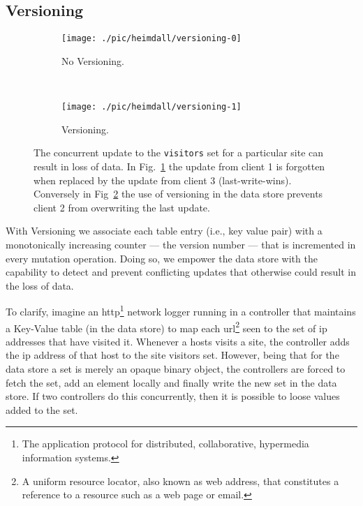 \subsection {Versioning}
\label{sec:heimdall:versioning}
\begin{figure}[ht]
  \centering
  \begin{subfigure}[b]{0.5\textwidth}
                \centering
                \texttt{[image: ./pic/heimdall/versioning-0]}
                \caption{No Versioning.} 
                \label{fig:heimdall:versioning-0}

        \end{subfigure}%
        ~
        \begin{subfigure}[b]{0.5\textwidth}
                \centering
                \texttt{[image: ./pic/heimdall/versioning-1]}
                \caption{Versioning.}
                \label{fig:heimdall:versioning-1}
        \end{subfigure}
  \caption[Concurrent updates]{The concurrent update to the \texttt{visitors} set for a particular site can result in loss of data. In  Fig.~\ref{fig:heimdall:versioning-0} the update from client 1 is forgotten  when replaced by the update from client 3 (last-write-wins).  Conversely in Fig~\ref{fig:heimdall:versioning-1} the use of versioning in the data store prevents client 2 from overwriting the last update.}
\label{fig:heimdall:versioning}
\end{figure}

With Versioning we associate each table entry (i.e., key value pair)  with a monotonically increasing counter --- the version number ---   that is incremented in every mutation operation. 
Doing so, we empower the data store with the capability to detect and prevent conflicting updates that otherwise could result in the loss of data. 

To clarify, imagine an \gls{http}\footnote{The application protocol for distributed, collaborative, hypermedia information systems.} network logger running in a controller that maintains  a Key-Value table  (in the data store) to map each \gls{url}\footnote{A uniform resource locator, also known as web address,  that constitutes a reference to a resource such as a web page or email.} seen to the set of \gls{ip} addresses that have visited it. 
Whenever a hosts visits a site, the controller adds the \gls{ip} address of that host to the site visitors set. 
However, being that  for the data store a set is merely an opaque binary object, the controllers are forced to fetch the set, add an element locally and finally write the new set in the data store. If two controllers do this concurrently, then it is possible to loose values added to the set. 

